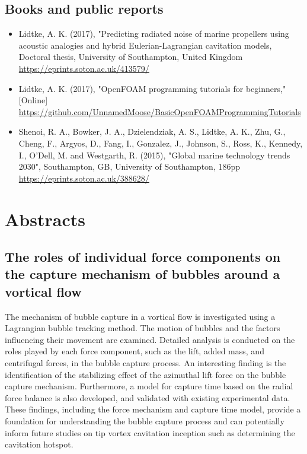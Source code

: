 \documentclass[a4paper,10pt]{article}
\begin{document}
\subsection{Books and public reports}
%
\begin{itemize}
\item Lidtke, A. K. (2017), "Predicting radiated noise of marine propellers using acoustic analogies and hybrid Eulerian-Lagrangian cavitation models,
	Doctoral thesis, University of Southampton, United Kingdom
	\cite{Lidtke2017d}
	\\ \url{https://eprints.soton.ac.uk/413579/}
%
\item Lidtke, A. K. (2017), "OpenFOAM programming tutorials for beginners," [Online]
	\cite{Lidtke2017c}
	\\ \url{https://github.com/UnnamedMoose/BasicOpenFOAMProgrammingTutorials}
%
\item Shenoi, R. A., Bowker, J. A., Dzielendziak, A. S., Lidtke, A. K., Zhu, G., Cheng, F.,
	Argyos, D., Fang, I., Gonzalez, J., Johnson, S., Ross, K., Kennedy, I., O'Dell, M.
	and Westgarth, R. (2015), "Global marine technology trends 2030", Southampton, GB,
	University of Southampton, 186pp
	\cite{Shenoi2015}
	\\ \url{https://eprints.soton.ac.uk/388628/}
%
\end{itemize}

\newpage

\section{Abstracts}

\subsection{The roles of individual force components on the capture mechanism of bubbles around a vortical flow \cite{huang_roles_2024}}

The mechanism of bubble capture in a vortical flow is investigated using a Lagrangian bubble tracking method. The motion of bubbles and the factors influencing their movement are examined. Detailed analysis is conducted on the roles played by each force component, such as the lift, added mass, and centrifugal forces, in the bubble capture process. An interesting finding is the identification of the stabilizing effect of the azimuthal lift force on the bubble capture mechanism. Furthermore, a model for capture time based on the radial force balance is also developed, and validated with existing experimental data. These findings, including the force mechanism and capture time model, provide a foundation for understanding the bubble capture process and can potentially inform future studies on tip vortex cavitation inception such as determining the cavitation hotspot.
	
\end{document}
